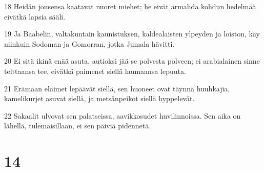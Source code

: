 \par 18 Heidän jousensa kaatavat nuoret miehet; he eivät armahda kohdun hedelmää eivätkä lapsia sääli.
\par 19 Ja Baabelin, valtakuntain kaunistuksen, kaldealaisten ylpeyden ja loiston, käy niinkuin Sodoman ja Gomorran, jotka Jumala hävitti.
\par 20 Ei sitä ikinä enää asuta, autioksi jää se polvesta polveen; ei arabialainen sinne telttaansa tee, eivätkä paimenet siellä laumaansa lepuuta.
\par 21 Erämaan eläimet lepäävät siellä, sen huoneet ovat täynnä huuhkajia, kamelikurjet asuvat siellä, ja metsänpeikot siellä hyppelevät.
\par 22 Sakaalit ulvovat sen palatseissa, aavikkosudet huvilinnoissa. Sen aika on lähellä, tulemaisillaan, ei sen päiviä pidennetä.

\chapter{14}

